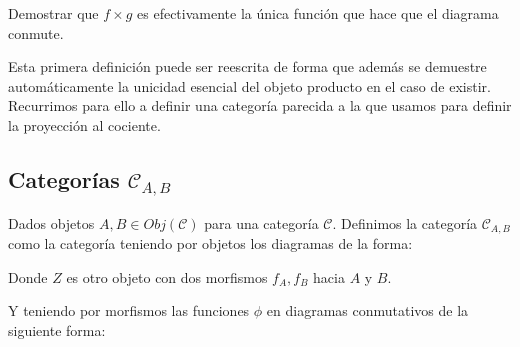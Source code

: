 \documentclass[11pt, fleqn, spanish]{book}
\newcommand{\C}{\mathcal{C} }
\begin{document}
    \begin{exercise} 
      Demostrar que $f \times g$ es efectivamente la única función que hace que el
      diagrama conmute.
    \end{exercise}

    
    Esta primera definición puede ser reescrita de forma que además se demuestre automáticamente
    la unicidad esencial del objeto producto en el caso de existir. Recurrimos para ello a
    definir una categoría parecida a la que usamos para definir la proyección al cociente.
  
  \subsection{Categorías \texorpdfstring{$\C_{A,B}$}{C A,B}}
    Dados objetos $A,B \in Obj(\C)$ para una categoría $\C$. Definimos la categoría $\C_{A,B}$
    como la categoría teniendo por objetos los diagramas de la forma:
    \begin{center}
    \end{center}
    Donde $Z$ es otro objeto con dos morfismos $f_A,f_B$ hacia $A$ y $B$.
    
    Y teniendo por morfismos las funciones $\phi$ en diagramas conmutativos de la siguiente forma:
    \begin{center}
    \end{center}
    
\end{document}

